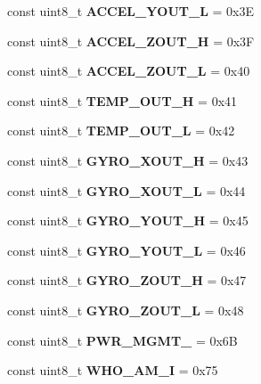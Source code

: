 \begin{DoxyCompactItemize}
\item 
\mbox{\label{classMpu6050_a35f0bcc7ad09b6c0377af028cfcde199}} 
const uint8\+\_\+t {\bfseries A\+C\+C\+E\+L\+\_\+\+Y\+O\+U\+T\+\_\+L} = 0x3E
\item 
\mbox{\label{classMpu6050_a84bcdb0eb22351d312c2acea1e55f9d9}} 
const uint8\+\_\+t {\bfseries A\+C\+C\+E\+L\+\_\+\+Z\+O\+U\+T\+\_\+H} = 0x3F
\item 
\mbox{\label{classMpu6050_a6912193baf5e193411e0242a63f409a3}} 
const uint8\+\_\+t {\bfseries A\+C\+C\+E\+L\+\_\+\+Z\+O\+U\+T\+\_\+L} = 0x40
\item 
\mbox{\label{classMpu6050_a81960062e0b6c7eb3046f780212197aa}} 
const uint8\+\_\+t {\bfseries T\+E\+M\+P\+\_\+\+O\+U\+T\+\_\+H} = 0x41
\item 
\mbox{\label{classMpu6050_a14a01e990105199c76dc1e6986928c56}} 
const uint8\+\_\+t {\bfseries T\+E\+M\+P\+\_\+\+O\+U\+T\+\_\+L} = 0x42
\item 
\mbox{\label{classMpu6050_a8433473388f7be36afb12857f351adf2}} 
const uint8\+\_\+t {\bfseries G\+Y\+R\+O\+\_\+\+X\+O\+U\+T\+\_\+H} = 0x43
\item 
\mbox{\label{classMpu6050_a5216c974e2a362aad2c61d4b01e78697}} 
const uint8\+\_\+t {\bfseries G\+Y\+R\+O\+\_\+\+X\+O\+U\+T\+\_\+L} = 0x44
\item 
\mbox{\label{classMpu6050_a410e7589a15107905baf41b723d99fbf}} 
const uint8\+\_\+t {\bfseries G\+Y\+R\+O\+\_\+\+Y\+O\+U\+T\+\_\+H} = 0x45
\item 
\mbox{\label{classMpu6050_a37bfd7f95e22ba0827864653bdd2e199}} 
const uint8\+\_\+t {\bfseries G\+Y\+R\+O\+\_\+\+Y\+O\+U\+T\+\_\+L} = 0x46
\item 
\mbox{\label{classMpu6050_a1307bd3b4b78a2d1ecfbccbcb6d02e54}} 
const uint8\+\_\+t {\bfseries G\+Y\+R\+O\+\_\+\+Z\+O\+U\+T\+\_\+H} = 0x47
\item 
\mbox{\label{classMpu6050_a397b0875ee6cfa5acfec3d65a40554fd}} 
const uint8\+\_\+t {\bfseries G\+Y\+R\+O\+\_\+\+Z\+O\+U\+T\+\_\+L} = 0x48
\item 
\mbox{\label{classMpu6050_a7f745e0647b344a7d4c4ef51006783a5}} 
const uint8\+\_\+t {\bfseries P\+W\+R\+\_\+\+M\+G\+M\+T\+\_} = 0x6B
\item 
\mbox{\label{classMpu6050_af431e27764c9d39f1691881ef4364c5b}} 
const uint8\+\_\+t {\bfseries W\+H\+O\+\_\+\+A\+M\+\_\+I} = 0x75
\end{DoxyCompactItemize}


